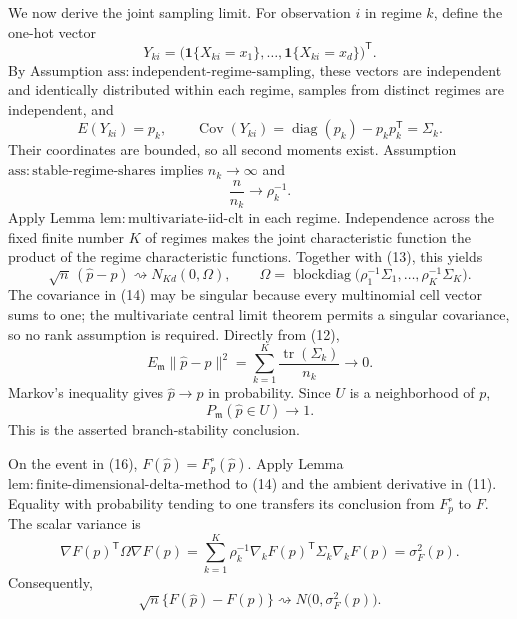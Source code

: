 We now derive the joint sampling limit.  For observation \(i\) in regime \(k\), define the one-hot vector
\[
 Y_{ki}=\bigl(\mathbf 1\{X_{ki}=x_1\},\ldots,
                    \mathbf 1\{X_{ki}=x_d\}\bigr)^{\mathsf T}.
\]
By Assumption \(\mathrm{ass:independent\text{-}regime\text{-}sampling}\), these vectors are independent and identically distributed within each regime, samples from distinct regimes are independent, and
\[
 E(Y_{ki})=p_k,
 \qquad
 \operatorname{Cov}(Y_{ki})
 =\operatorname{diag}(p_k)-p_kp_k^{\mathsf T}
 =\Sigma_k. \tag{12}
\]
Their coordinates are bounded, so all second moments exist.  Assumption \(\mathrm{ass:stable\text{-}regime\text{-}shares}\) implies \(n_k\to\infty\) and
\[
 \frac{n}{n_k}\longrightarrow\rho_k^{-1}. \tag{13}
\]
Apply Lemma \(\mathrm{lem:multivariate\text{-}iid\text{-}clt}\) in each regime.  Independence across the fixed finite number \(K\) of regimes makes the joint characteristic function the product of the regime characteristic functions.  Together with (13), this yields
\[
 \sqrt n\,(\widehat p-p)
 \rightsquigarrow
 N_{Kd}(0,\Omega),
 \qquad
 \Omega=\operatorname{blockdiag}
 \bigl(\rho_1^{-1}\Sigma_1,\ldots,
       \rho_K^{-1}\Sigma_K\bigr). \tag{14}
\]
The covariance in (14) may be singular because every multinomial cell vector sums to one; the multivariate central limit theorem permits a singular covariance, so no rank assumption is required.  Directly from (12),
\[
 E_{\mathfrak m}\|\widehat p-p\|^2
 =\sum_{k=1}^{K}\frac{\operatorname{tr}(\Sigma_k)}{n_k}
 \longrightarrow0. \tag{15}
\]
Markov's inequality gives \(\widehat p\to p\) in probability.  Since \(U\) is a neighborhood of \(p\),
\[
 P_{\mathfrak m}(\widehat p\in U)\longrightarrow1. \tag{16}
\]
This is the asserted branch-stability conclusion.

On the event in (16), \(F(\widehat p)=F_p^{\circ}(\widehat p)\).  Apply Lemma \(\mathrm{lem:finite\text{-}dimensional\text{-}delta\text{-}method}\) to (14) and the ambient derivative in (11).  Equality with probability tending to one transfers its conclusion from \(F_p^{\circ}\) to \(F\).  The scalar variance is
\[
 \nabla F(p)^{\mathsf T}\Omega\nabla F(p)
 =\sum_{k=1}^{K}\rho_k^{-1}
   \nabla_kF(p)^{\mathsf T}\Sigma_k\nabla_kF(p)
 =\sigma_F^2(p). \tag{17}
\]
Consequently,
\[
 \sqrt n\{F(\widehat p)-F(p)\}
 \rightsquigarrow N\bigl(0,\sigma_F^2(p)\bigr). \tag{18}
\]

